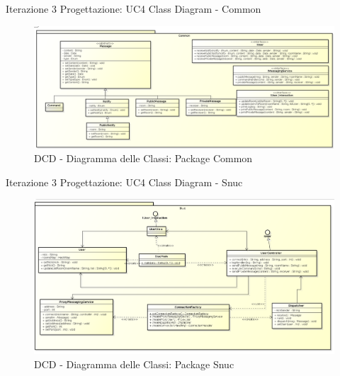 \documentclass[t]{beamer} %
\begin{document}
\begin{frame} {Iterazione 3 Progettazione: UC4 Class Diagram - Common}
   \begin{figure}
     \includegraphics[scale=0.215]{image_astah/Iteration_3_DesignModel/ClassDiagramCommon.png}{\centering}
     \caption{DCD - Diagramma delle Classi: Package Common }
     \label{fig_UC4_DCD_1} 
   \end{figure}
\end{frame}

\begin{frame} {Iterazione 3 Progettazione: UC4 Class Diagram - Snuc}
   \begin{figure}
     \includegraphics[scale=0.235]{image_astah/Iteration_3_DesignModel/ClassDiagramSnuc.png}{\centering}
     \caption{DCD - Diagramma delle Classi: Package Snuc }
     \label{fig_UC4_DCD_3} 
   \end{figure}
\end{frame}
\end{document}

